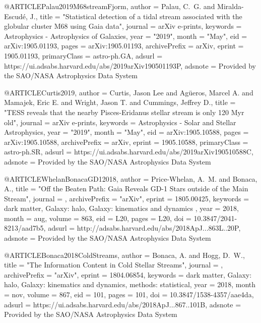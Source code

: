 \documentclass[apj]{emulateapj}
\begin{document}
{{{{@ARTICLE{Palau2019M68streamFjorm,
       author = {{Palau}, C.~G. and {Miralda-Escud{\'e}}, J.},
        title = "{Statistical detection of a tidal stream associated with the globular cluster M68 using Gaia data}",
      journal = {arXiv e-prints},
     keywords = {Astrophysics - Astrophysics of Galaxies},
         year = "2019",
        month = "May",
          eid = {arXiv:1905.01193},
        pages = {arXiv:1905.01193},
archivePrefix = {arXiv},
       eprint = {1905.01193},
 primaryClass = {astro-ph.GA},
       adsurl = {https://ui.adsabs.harvard.edu/abs/2019arXiv190501193P},
      adsnote = {Provided by the SAO/NASA Astrophysics Data System}
}



@ARTICLE{Curtis2019,
       author = {{Curtis}, Jason Lee and {Ag{\"u}eros}, Marcel A. and {Mamajek}, Eric E. and
         {Wright}, Jason T. and {Cummings}, Jeffrey D.},
        title = "{TESS reveals that the nearby Pisces-Eridanus stellar stream is only 120 Myr old}",
      journal = {arXiv e-prints},
     keywords = {Astrophysics - Solar and Stellar Astrophysics},
         year = "2019",
        month = "May",
          eid = {arXiv:1905.10588},
        pages = {arXiv:1905.10588},
archivePrefix = {arXiv},
       eprint = {1905.10588},
 primaryClass = {astro-ph.SR},
       adsurl = {https://ui.adsabs.harvard.edu/abs/2019arXiv190510588C},
      adsnote = {Provided by the SAO/NASA Astrophysics Data System}
}



@ARTICLE{WhelanBonacaGD12018,
   author = {{Price-Whelan}, A.~M. and {Bonaca}, A.},
    title = "{Off the Beaten Path: Gaia Reveals GD-1 Stars outside of the Main Stream}",
  journal = {\apjl},
archivePrefix = "arXiv",
   eprint = {1805.00425},
 keywords = {dark matter, Galaxy: halo, Galaxy: kinematics and dynamics },
     year = 2018,
    month = aug,
   volume = 863,
      eid = {L20},
    pages = {L20},
      doi = {10.3847/2041-8213/aad7b5},
   adsurl = {http://adsabs.harvard.edu/abs/2018ApJ...863L..20P},
  adsnote = {Provided by the SAO/NASA Astrophysics Data System}
}


@ARTICLE{Bonaca2018ColdStreams,
   author = {{Bonaca}, A. and {Hogg}, D.~W.},
    title = "{The Information Content in Cold Stellar Streams}",
  journal = {\apj},
archivePrefix = "arXiv",
   eprint = {1804.06854},
 keywords = {dark matter, Galaxy: halo, Galaxy: kinematics and dynamics, methods: statistical},
     year = 2018,
    month = nov,
   volume = 867,
      eid = {101},
    pages = {101},
      doi = {10.3847/1538-4357/aae4da},
   adsurl = {https://ui.adsabs.harvard.edu/abs/2018ApJ...867..101B},
  adsnote = {Provided by the SAO/NASA Astrophysics Data System}
}



}}}}
\end{document}
